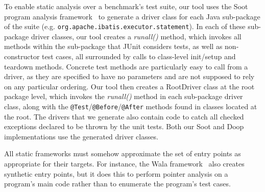 
To enable static analysis over a benchmark's test suite, our tool uses the Soot program analysis framework~\cite{Vallee-Rai:1999:SJB:781995.782008} to generate a driver class for each Java sub-package of the suite (e.g. \texttt{org.apache.ibatis.executor.statement}). In each of these sub-package driver classes, our tool creates a \textit{runall()} method, which invokes all methods within the sub-package that JUnit considers tests, as well as non-constructor test cases, all surrounded by calls to class-level init/setup and teardown methods. Concrete test methods are particularly easy to call from a driver, as they are specified to have no parameters and are not supposed to rely on any particular ordering. 
Our tool then creates a RootDriver class at the root package level, which invokes the \textit{runall()} method in each sub-package driver class, along with the \texttt{@Test}/\texttt{@Before}/\texttt{@After} methods found in classes located at the root. The drivers that we generate also contain code to catch all checked exceptions declared to be thrown by the unit tests. Both our Soot and Doop implementations use the generated driver classes.

All static frameworks must somehow approximate the set of entry points as appropriate for their targets. For instance, the Wala framework~\cite{wala19:_t} also creates synthetic entry points, but it does this to perform pointer analysis on a program's main code rather than to enumerate the program's test cases.
